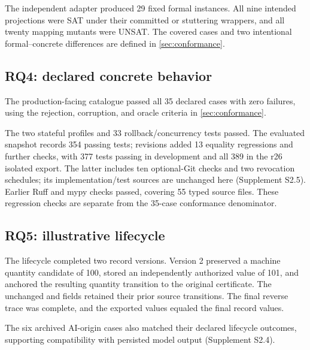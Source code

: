 The independent adapter produced 29 fixed formal instances. All nine intended projections were SAT under their committed or stuttering wrappers, and all twenty mapping mutants were UNSAT. The covered cases and two intentional formal--concrete differences are defined in \cref{sec:conformance}.

\subsection{RQ4: declared concrete behavior}

The production-facing catalogue passed all 35 declared cases with zero failures, using the rejection, corruption, and oracle criteria in \cref{sec:conformance}.

The two stateful profiles and 33 rollback/concurrency tests passed. The evaluated snapshot records 354 passing tests; revisions added 13 equality regressions and further checks, with 377 tests passing in development and all 389 in the r26 isolated export. The latter includes ten optional-Git checks and two revocation schedules; its implementation/test sources are unchanged here (Supplement S2.5). Earlier Ruff and mypy checks passed, covering 55 typed source files. These regression checks are separate from the 35-case conformance denominator.



\subsection{RQ5: illustrative lifecycle}

The lifecycle completed two record versions. Version 2 preserved a machine quantity candidate of 100, stored an independently authorized value of 101, and anchored the resulting quantity transition to the original certificate. The unchanged  and  fields retained their prior source transitions. The final reverse trace was complete, and the exported values equaled the final record values.

The six archived AI-origin cases also matched their declared lifecycle outcomes, supporting compatibility with persisted model output (Supplement S2.4).

